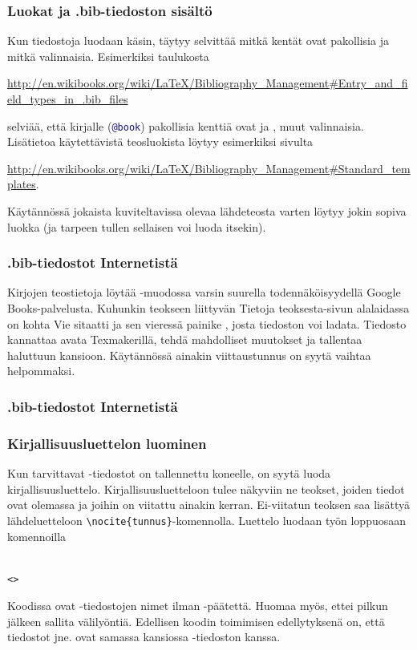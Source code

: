 \begin{frame}[fragile]
    \frametitle{Luokat ja .bib-tiedoston sisältö}
    Kun tiedostoja luodaan käsin, täytyy selvittää mitkä kentät ovat pakollisia ja mitkä valinnaisia. 
    \vaihto
    Esimerkiksi taulukosta 
    \begin{scriptsize}
        \url{http://en.wikibooks.org/wiki/LaTeX/Bibliography_Management#Entry_and_field_types_in_.bib_files}
    \end{scriptsize}
    selviää, että kirjalle (\lstinline[language=BibTeX]-@book-) pakollisia kenttiä ovat  ja , muut valinnaisia.
    \vaihto
    Lisätietoa käytettävistä teosluokista löytyy esimerkiksi sivulta
    \begin{scriptsize}
        \url{http://en.wikibooks.org/wiki/LaTeX/Bibliography_Management#Standard_templates}.
    \end{scriptsize}
    \vaihto
    Käytännössä jokaista kuviteltavissa olevaa lähdeteosta varten löytyy jokin sopiva luokka (ja tarpeen tullen sellaisen voi luoda itsekin).
\end{frame}

\begin{frame}[fragile]
    
\end{frame}

\begin{frame}[fragile]
    \frametitle{.bib-tiedostot Internetistä}
    Kirjojen teostietoja löytää \BibTeX -muodossa varsin suurella todennäköisyydellä Google Books-palvelusta. 
    \vaihto
    Kuhunkin teokseen liittyvän Tietoja teoksesta-sivun alalaidassa on kohta Vie sitaatti ja sen vieressä painike \BibTeX, josta tiedoston voi ladata.
    \vaihto
    Tiedosto kannattaa avata Texmakerillä, tehdä mahdolliset muutokset ja tallentaa haluttuun kansioon. 
    \vaihto
    Käytännössä ainakin viittaustunnus on syytä vaihtaa helpommaksi.
\end{frame}

\begin{frame}[fragile]
    \frametitle{.bib-tiedostot Internetistä}
    
\end{frame}

\begin{frame}[fragile]
    \frametitle{Kirjallisuusluettelon luominen}
    Kun tarvittavat -tiedostot on tallennettu koneelle, on syytä luoda kirjallisuusluettelo. Kirjallisuusluetteloon tulee näkyviin ne teokset, joiden tiedot ovat olemassa ja joihin on viitattu ainakin kerran. Ei-viitatun teoksen saa lisättyä lähdeluetteloon \lstinline-\nocite{tunnus}--komennolla.
    \vaihto
    Luettelo luodaan työn loppuosaan komennoilla
    \begin{lstlisting}

<>
    \end{lstlisting}
    Koodissa  ovat -tiedostojen nimet ilman -päätettä. Huomaa myös, ettei pilkun jälkeen sallita välilyöntiä.
    \vaihto
    Edellisen koodin toimimisen edellytyksenä on, että tiedostot  jne. ovat samassa kansiossa -tiedoston kanssa. 
\end{frame}

